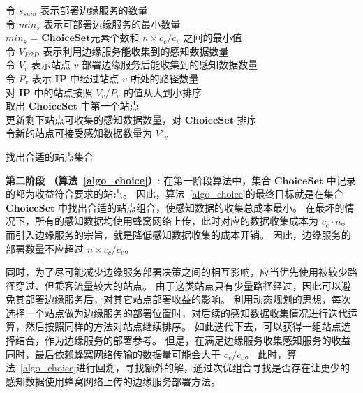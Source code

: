 \begin{algorithm}[!b]
\setstretch{\algostretch}
令 $s_{sum}$ 表示部署边缘服务的数量\\
令 $min_s$ 表示可部署边缘服务的最小数量\\
$min_s$ = $\boldsymbol{ChoiceSet}$元素个数和 $n \times c_c/c_v$ 之间的最小值\\
令 $V_{D2D}$ 表示利用边缘服务能收集到的感知数据数量\\
令 $V_v$ 表示站点 $v$ 部署边缘服务后能收集到的感知数据数量\\
令 $P_v$ 表示 $\boldsymbol{IP}$ 中经过站点 $v$ 所处的路径数量\\
对 $\boldsymbol{IP}$ 中的站点按照 $V_v$/$P_v$ 的值从大到小排序\\
取出 $\boldsymbol{ChoiceSet}$ 中第一个站点\\
更新剩下站点可收集的感知数据数量，对 $\boldsymbol{ChoiceSet}$ 排序\\
令新的站点可接受感知数据数量为 $V'_v$\\
\caption{找出合适的站点集合}
\label{algo_choice}
\end{algorithm}

\textbf{第二阶段 （算法~\ref{algo_choice}）}:
在第一阶段算法中，集合 $\boldsymbol{ChoiceSet}$ 中记录的都为收益符合要求的站点。
因此，算法~\ref{algo_choice}的最终目标就是在集合 $\boldsymbol{ChoiceSet}$ 中找出合适的站点组合，使感知数据的收集总成本最小。
在最坏的情况下，所有的感知数据均使用蜂窝网络上传，此时对应的数据收集成本为 $c_c \cdot n$。
而引入边缘服务的宗旨，就是降低感知数据收集的成本开销。
因此，边缘服务的部署数量不应超过 $n\times c_c / c_v$。

同时，为了尽可能减少边缘服务部署决策之间的相互影响，应当优先使用被较少路径穿过、但乘客流量较大的站点。
由于这类站点只有少量路径经过，因此可以避免其部署边缘服务后，对其它站点部署收益的影响。
利用动态规划的思想，每次选择一个站点做为边缘服务的部署位置时，对后续的感知数据收集情况进行迭代运算，然后按照同样的方法对站点继续排序。
如此迭代下去，可以获得一组站点选择结合，作为边缘服务的部署参考。
但是，在满足边缘服务收集感知服务的收益同时，最后依赖蜂窝网络传输的数据量可能会大于 $c_v / c_c$。
此时，算法~\ref{algo_choice}进行回溯，寻找额外的解，通过次优组合寻找是否存在让更少的感知数据使用蜂窝网络上传的边缘服务部署方法。

